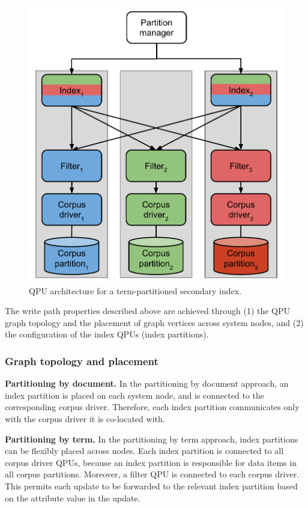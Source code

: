 \begin{figure}
\begin{minipage}{.5\textwidth}
    \includegraphics[scale=0.5]{./figures/case_studies/index_partitioned_by_term.pdf}
    \caption{QPU architecture for a term-partitioned secondary index.}
    \label{fig:index_partitioned_by_term}
  \end{minipage}
\end{figure}

The write path properties described above are achieved through (1) the QPU graph topology and the placement of graph vertices across system nodes,
and (2) the configuration of the index QPUs (index partitions).

\subsubsection{Graph topology and placement}

\medskip
\noindent
\textbf{Partitioning by document.}
In the partitioning by document approach, an index partition is placed on each system node, and is connected to the
corresponding corpus driver.
Therefore, each index partition communicates only with the corpus driver it is co-located with.

\medskip
\noindent
\textbf{Partitioning by term.}
In the partitioning by term approach, index partitions can be flexibly placed across nodes.
Each index partition is connected to all corpus driver QPUs, because an index partition is responsible for data
items in all corpus partitions.
Moreover, a filter QPU is connected to each corpus driver.
This permits each update to be forwarded to the relevant index partition based on the attribute value in the update.

